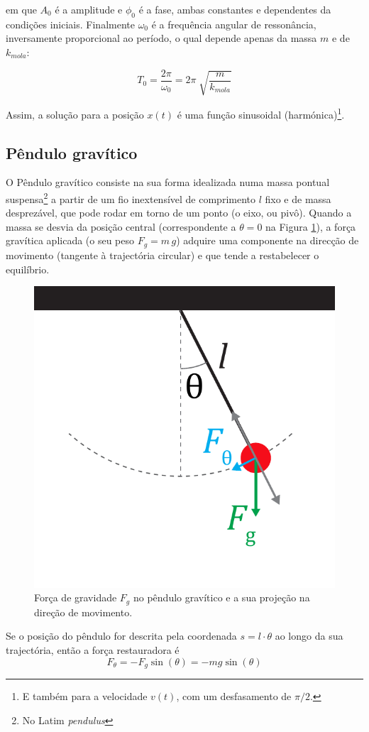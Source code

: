 \documentclass[a4paper,twoside,12pt]{article}      %
\begin{document}
em que $ A_0 $ é a amplitude e $\phi_0$ é a fase, ambas constantes e dependentes da condições iniciais. Finalmente $\omega_0$ é a frequência angular de ressonância, inversamente proporcional ao período, o qual depende apenas da massa $m$ e de $k_{mola}$:

\begin{equation}
	\label{eq:period_mola}
T_0 = \frac{2 \pi}{\omega_0} = 2\pi\; \sqrt{\frac{m}{k_{mola}}}
\end{equation}

Assim, a solução para a posição $x(t)$ é uma função sinusoidal (harmónica)\footnote{E também para a velocidade $v(t)$, com um desfasamento de $\pi/2$.}.



\subsection{\sf Pêndulo gravítico}
O Pêndulo gravítico consiste na sua forma idealizada numa massa pontual suspensa\footnote{No Latim \emph{pendulus}} a partir de um fio inextensível de comprimento $l$ fixo e de massa desprezável, que pode rodar em torno de um ponto (o eixo, ou pivô). Quando a massa se desvia da posição central (correspondente a $\theta=0$ na Figura \ref{fig:3}), a força gravítica aplicada (o seu peso $F_g = m \, g $) adquire uma componente na direcção de movimento (tangente à trajectória circular) e que tende a restabelecer o equilíbrio. 

\begin{figure}
	[!htbp] \centering 
	\includegraphics[width=0.4	\textwidth]{Fig-2}
	\caption{Força de gravidade $F_g$ no pêndulo gravítico e a sua projeção na direção de movimento. \label{fig:3} } 
\end{figure}

Se o posição do pêndulo for descrita pela coordenada $s= l\cdot \theta$ ao longo da sua trajectória, 
então a força restauradora é 
\begin{equation}
	\label{eq:4} 
F_{\theta} = - F_{g} \sin(\theta) = - mg \sin(\theta)
\end{equation}
\end{document}
